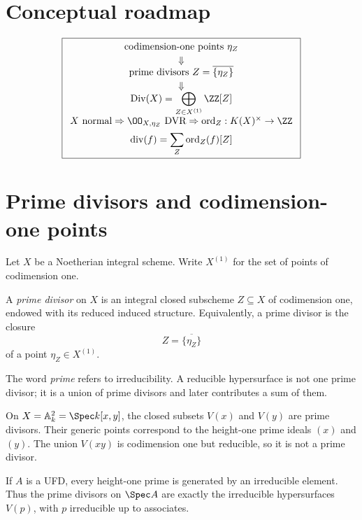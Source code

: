 \section*{Conceptual roadmap}
\[
\boxed{
\begin{array}{c}
\text{codimension-one points}\ \eta_Z
\\[2pt]
\Downarrow
\\[-1pt]
\text{prime divisors } Z=\overline{\{\eta_Z\}}
\\[2pt]
\Downarrow
\\[-1pt]
\Div(X)=\displaystyle\bigoplus_{Z\in X^{(1)}}\ZZ[Z]
\\[5pt]
X\ \text{normal}\Rightarrow \OO_{X,\eta_Z}\ \text{DVR}
\Rightarrow \operatorname{ord}_Z:K(X)^\times\to\ZZ
\\[5pt]
\operatorname{div}(f)=\displaystyle\sum_Z\operatorname{ord}_Z(f)[Z]
\end{array}}
\]



\section{Prime divisors and codimension-one points}
Let \(X\) be a Noetherian integral scheme.  Write \(X^{(1)}\) for the set of points of codimension one.

\begin{definition}\label{def:vi39-prime-divisor}
A \emph{prime divisor} on \(X\) is an integral closed subscheme \(Z\subseteq X\) of codimension one, endowed with its reduced induced structure.  Equivalently, a prime divisor is the closure
\[
 Z=\overline{\{\eta_Z\}}
\]
of a point \(\eta_Z\in X^{(1)}\).
\end{definition}

The word \emph{prime} refers to irreducibility.  A reducible hypersurface is not one prime divisor; it is a union of prime divisors and later contributes a sum of them.

\begin{example}\label{ex:vi39-axes}
On \(X=\mathbb{A}^2_k=\Spec k[x,y]\), the closed subsets \(V(x)\) and \(V(y)\) are prime divisors.  Their generic points correspond to the height-one prime ideals \((x)\) and \((y)\).  The union \(V(xy)\) is codimension one but reducible, so it is not a prime divisor.
\end{example}

\begin{example}\label{ex:vi39-ufd-primes}
If \(A\) is a UFD, every height-one prime is generated by an irreducible element.  Thus the prime divisors on \(\Spec A\) are exactly the irreducible hypersurfaces \(V(p)\), with \(p\) irreducible up to associates.
\end{example}

